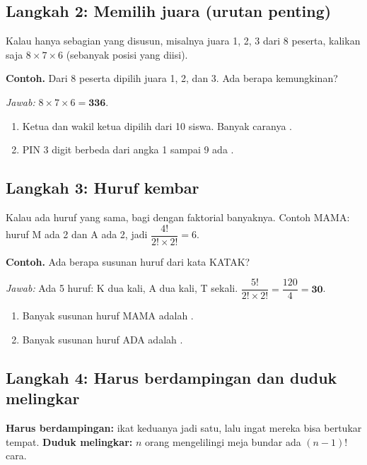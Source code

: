 \documentclass[11pt,a4paper]{article}
\begin{document}
\subsection*{Langkah 2: Memilih juara (urutan penting)}
Kalau hanya sebagian yang disusun, misalnya juara 1, 2, 3 dari 8 peserta, kalikan saja
$8 \times 7 \times 6$ (sebanyak posisi yang diisi).

\begin{contoh}
\textbf{Contoh.} Dari 8 peserta dipilih juara 1, 2, dan 3. Ada berapa kemungkinan?

\textit{Jawab:} $8 \times 7 \times 6 = \textbf{336}$.
\end{contoh}

\begin{giliranmu}
\begin{enumerate}[label=\alph*.]
    \item Ketua dan wakil ketua dipilih dari 10 siswa. Banyak caranya \kosong.
    \item PIN 3 digit berbeda dari angka 1 sampai 9 ada \kosong.
\end{enumerate}
\end{giliranmu}

\subsection*{Langkah 3: Huruf kembar}
Kalau ada huruf yang sama, bagi dengan faktorial banyaknya. Contoh MAMA: huruf M ada 2 dan
A ada 2, jadi $\dfrac{4!}{2! \times 2!} = 6$.

\begin{contoh}
\textbf{Contoh.} Ada berapa susunan huruf dari kata KATAK?

\textit{Jawab:} Ada 5 huruf: K dua kali, A dua kali, T sekali.
$\dfrac{5!}{2! \times 2!} = \dfrac{120}{4} = \textbf{30}$.
\end{contoh}

\begin{giliranmu}
\begin{enumerate}[label=\alph*.]
    \item Banyak susunan huruf MAMA adalah \kosong.
    \item Banyak susunan huruf ADA adalah \kosong.
\end{enumerate}
\end{giliranmu}

\subsection*{Langkah 4: Harus berdampingan dan duduk melingkar}
\textbf{Harus berdampingan:} ikat keduanya jadi satu, lalu ingat mereka bisa bertukar tempat.
\textbf{Duduk melingkar:} $n$ orang mengelilingi meja bundar ada $(n-1)!$ cara.
\end{document}

